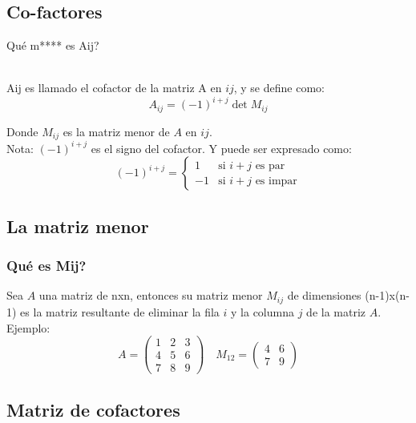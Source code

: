\documentclass{beamer}
\begin{document}
    \subsection{Co-factores}

    \begin{frame}
        \begin{center}
            Qué m**** es A{ij}?
        \end{center}\\
        A{ij} es llamado el cofactor de la matriz A en $ij$, y se define como:
        $$
        A_{ij} = (-1)^{i+j}\det{M_{ij}}
        $$

        Donde $M_{ij}$ es la matriz menor de $A$ en $ij$.\\
        Nota: $(-1)^{i+j}$ es el signo del cofactor. Y puede ser expresado como:
        $$
        (-1)^{i+j} =
        \begin{cases}
            1 & \text{si } i+j \text{ es par}\\
            -1 & \text{si } i+j \text{ es impar}
        \end{cases}
        $$
    \end{frame}

    \subsection{La matriz menor}

    \begin{frame}
        \frametitle{Qué es Mij?}
        Sea $A$ una matriz de nxn, entonces su matriz menor $M_{ij}$ de dimensiones (n-1)x(n-1) es la matriz resultante de eliminar la fila $i$ y la columna $j$ de la matriz $A$.\\
        Ejemplo:
        $$
        A =
        \begin{pmatrix}
            1 & 2 & 3 \\
            4 & 5 & 6 \\
            7 & 8 & 9
        \end{pmatrix}
        \quad M_{12} =
        \begin{pmatrix}
            4 & 6 \\
            7 & 9
        \end{pmatrix}
        $$
    \end{frame}

    \subsection{Matriz de cofactores}
\end{document}
